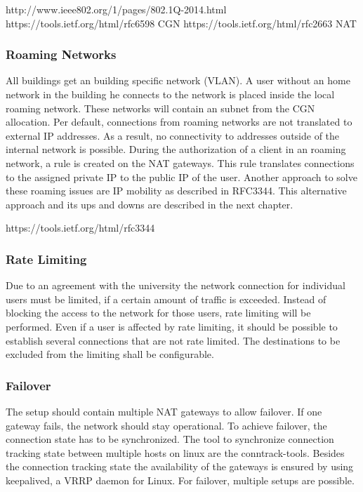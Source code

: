 http://www.ieee802.org/1/pages/802.1Q-2014.html
https://tools.ietf.org/html/rfc6598 CGN
https://tools.ietf.org/html/rfc2663 NAT

\subsubsection{Roaming Networks}\label{roaming-networks}

All buildings get an building specific network (VLAN). A user without an
home network in the building he connects to the network is placed inside
the local roaming network. These networks will contain an subnet from
the CGN allocation. Per default, connections from roaming networks are
not translated to external IP addresses. As a result, no connectivity to
addresses outside of the internal network is possible. During the
authorization of a client in an roaming network, a rule is created on
the NAT gateways. This rule translates connections to the assigned
private IP to the public IP of the user. Another approach to solve these
roaming issues are IP mobility as described in RFC3344. This alternative
approach and its ups and downs are described in the next chapter.

https://tools.ietf.org/html/rfc3344

\subsubsection{Rate Limiting}\label{rate-limiting}

Due to an agreement with the university the network connection for
individual users must be limited, if a certain amount of traffic is
exceeded. Instead of blocking the access to the network for those users,
rate limiting will be performed. Even if a user is affected by rate
limiting, it should be possible to establish several connections that
are not rate limited. The destinations to be excluded from the limiting
shall be configurable.

\subsubsection{Failover}\label{failover}

The setup should contain multiple NAT gateways to allow failover. If one
gateway fails, the network should stay operational. To achieve failover,
the connection state has to be synchronized. The tool to synchronize
connection tracking state between multiple hosts on linux are the
conntrack-tools. Besides the connection tracking state the availability
of the gateways is ensured by using keepalived, a VRRP daemon for Linux.
For failover, multiple setups are possible.

